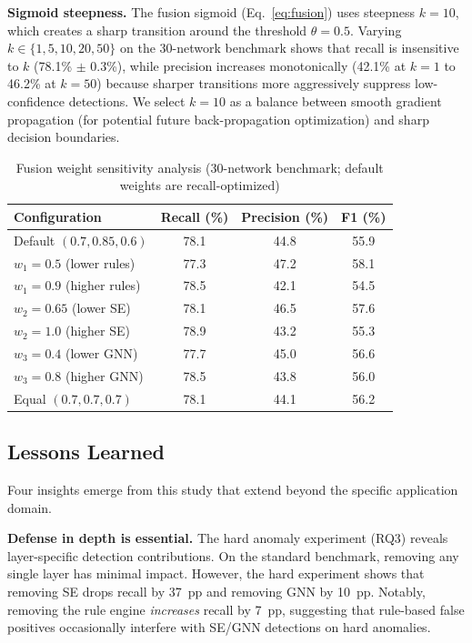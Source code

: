 \documentclass[research]{fcs}
\begin{document}
\textbf{Sigmoid steepness.} The fusion sigmoid (Eq.~\ref{eq:fusion}) uses steepness $k = 10$, which creates a sharp transition around the threshold $\theta = 0.5$. Varying $k \in \{1, 5, 10, 20, 50\}$ on the 30-network benchmark shows that recall is insensitive to $k$ (78.1\% $\pm$ 0.3\%), while precision increases monotonically (42.1\% at $k=1$ to 46.2\% at $k=50$) because sharper transitions more aggressively suppress low-confidence detections. We select $k = 10$ as a balance between smooth gradient propagation (for potential future back-propagation optimization) and sharp decision boundaries.

\begin{table}[htbp]
\centering
\footnotesize
\caption{Fusion weight sensitivity analysis (30-network benchmark; default weights are recall-optimized)}
\label{tab:weight_sensitivity}
\begin{tabular}{@{}lccc@{}}
\toprule
Configuration & Recall (\%) & Precision (\%) & F1 (\%) \\
\midrule
Default $(0.7, 0.85, 0.6)$ & 78.1 & 44.8 & 55.9 \\
$w_1 = 0.5$ (lower rules) & 77.3 & 47.2 & 58.1 \\
$w_1 = 0.9$ (higher rules) & 78.5 & 42.1 & 54.5 \\
$w_2 = 0.65$ (lower SE) & 78.1 & 46.5 & 57.6 \\
$w_2 = 1.0$ (higher SE) & 78.9 & 43.2 & 55.3 \\
$w_3 = 0.4$ (lower GNN) & 77.7 & 45.0 & 56.6 \\
$w_3 = 0.8$ (higher GNN) & 78.5 & 43.8 & 56.0 \\
Equal $(0.7, 0.7, 0.7)$ & 78.1 & 44.1 & 56.2 \\
\bottomrule
\end{tabular}
\end{table}

\subsection{Lessons Learned}

Four insights emerge from this study that extend beyond the specific application domain.

\textbf{Defense in depth is essential.} The hard anomaly experiment (RQ3) reveals layer-specific detection contributions. On the standard benchmark, removing any single layer has minimal impact. However, the hard experiment shows that removing SE drops recall by 37~pp and removing GNN by 10~pp. Notably, removing the rule engine \emph{increases} recall by 7~pp, suggesting that rule-based false positives occasionally interfere with SE/GNN detections on hard anomalies.
\end{document}
